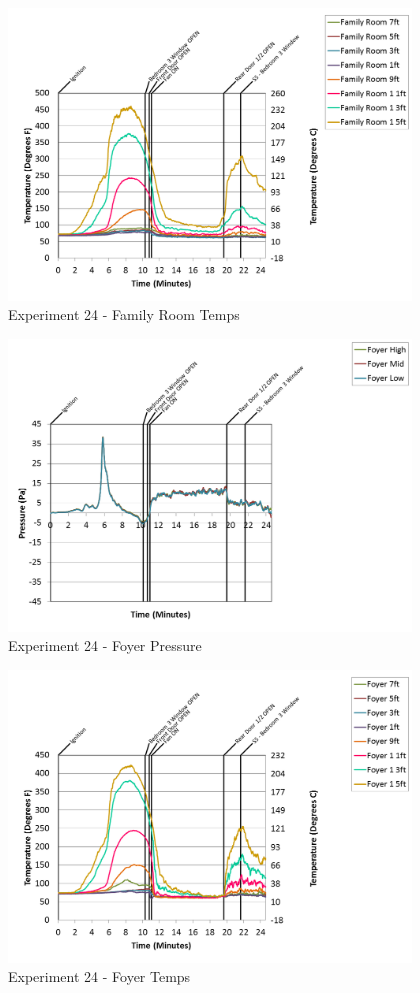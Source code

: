 \documentclass{article}
\begin{document}
\begin{appendices}
\clearpage

\begin{figure}[h!]
	\centering
	\includegraphics[height=3.05in]{0_Images/Results_Charts/Exp_24_Charts/FamilyRoomTemps.png}
	\caption{Experiment 24 - Family Room Temps}
\end{figure}


\begin{figure}[h!]
	\centering
	\includegraphics[height=3.05in]{0_Images/Results_Charts/Exp_24_Charts/FoyerPressure.png}
	\caption{Experiment 24 - Foyer Pressure}
\end{figure}

\clearpage

\begin{figure}[h!]
	\centering
	\includegraphics[height=3.05in]{0_Images/Results_Charts/Exp_24_Charts/FoyerTemps.png}
	\caption{Experiment 24 - Foyer Temps}
\end{figure}



\end{appendices}
\end{document}
